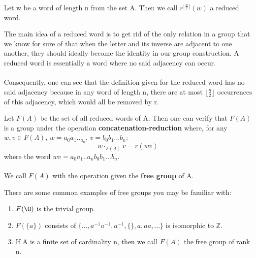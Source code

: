 \begin{definition}
Let w be a word of length n from the set A. Then we call $r^{\lfloor \frac{n}{2} \rfloor}(w)$ a reduced word.
\end{definition}
\noindent The main idea of a reduced word is to get rid of the only relation in a group that we know for sure of that when the letter and its inverse are adjacent to one another, they should ideally become the identity in our group construction. A reduced word is essentially a word where no said adjacency can occur.\\\\
Consequently, one can see that the definition given for the reduced word has no said adjacency because in any word of length n, there are at most $\lfloor \frac{n}{2} \rfloor$ occurrences of this adjacency, which would all be removed by r.\\

\begin{definition}
Let $F(A)$ be the set of all reduced words of A. Then one can verify that $F(A)$ is a group under the operation {\bf concatenation-reduction} where, for any $w, v \in F(A)$, $w = a_0a_1.._a_n$, $v = b_0b_1...b_n$:
\[w \cdot_{F(A)} v = r(wv)\]
where the word $wv = a_0a_1..a_nb_0b_1...b_n$.\\\\
We call $F(A)$ with the operation given the {\bf free group} of A.\\
\end{definition}

\begin{example}
There are some common examples of free groups you may be familiar with:
\begin{enumerate}
    \item $F(\O)$ is the trivial group.
    \item $F(\{a\})$ consists of $\{..., a^{-1}a^{-1}, a^{-1}, \{\}, a, aa, ...\}$ is isomorphic to $\mathbb{Z}$.
    \item If A is a finite set of cardinality n, then we call $F(A)$ the free group of rank n.
\end{enumerate}
\end{example}


